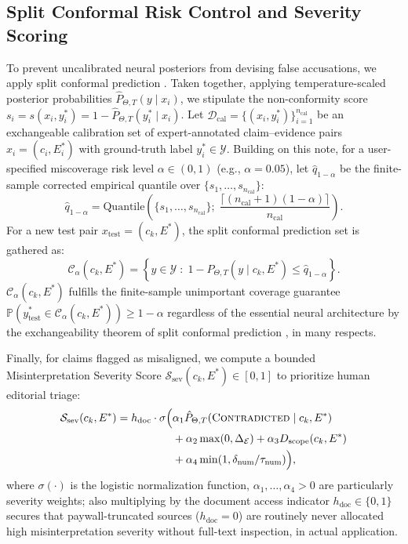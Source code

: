 \documentclass[sigconf]{acmart}
\begin{document}
\subsection{Split Conformal Risk Control and Severity Scoring}
To prevent uncalibrated neural posteriors from devising false accusations, we apply split conformal prediction \cite{sadinle2019least,angelopoulos2023conformal}. Taken together, applying temperature-scaled posterior probabilities $\hat{P}_{\Theta, T}(y \mid x_i)$, we stipulate the non-conformity score $s_i = s(x_i, y_i^*) = 1 - \hat{P}_{\Theta, T}(y_i^* \mid x_i)$. Let $\mathcal{D}_{\text{cal}} = \{(x_i, y_i^*)\}_{i=1}^{n_{\text{cal}}}$ be an exchangeable calibration set of expert-annotated claim--evidence pairs $x_i = (c_i, E_i^*)$ with ground-truth label $y_i^* \in \mathcal{Y}$. Building on this note, for a user-specified miscoverage risk level $\alpha \in (0, 1)$ (e.g., $\alpha = 0.05$), let $\hat{q}_{1-\alpha}$ be the finite-sample corrected empirical quantile over $\{s_1, \dots, s_{n_{\text{cal}}}\}$:
\begin{equation}
\hat{q}_{1-\alpha} = \text{Quantile}\!\left(\{s_1, \dots, s_{n_{\text{cal}}}\};\; \frac{\lceil (n_{\text{cal}} + 1)(1 - \alpha) \rceil}{n_{\text{cal}}}\right).
\label{eq:conformal_quantile}
\end{equation}
For a new test pair $x_{\text{test}} = (c_k, E^*)$, the split conformal prediction set is gathered as:
\begin{equation}
\mathcal{C}_{\alpha}(c_k, E^*) = \left\{ y \in \mathcal{Y} \;:\; 1 - \hat{P}_{\Theta, T}(y \mid c_k, E^*) \leq \hat{q}_{1-\alpha} \right\}.
\label{eq:conformal_set}
\end{equation}
$\mathcal{C}_{\alpha}(c_k, E^*)$ fulfills the finite-sample unimportant coverage guarantee $\mathbb{P}(y^*_{\text{test}} \in \mathcal{C}_{\alpha}(c_k, E^*)) \geq 1 - \alpha$ regardless of the essential neural architecture by the exchangeability theorem of split conformal prediction \cite{sadinle2019least,angelopoulos2023conformal}, in many respects.

Finally, for claims flagged as misaligned, we compute a bounded Misinterpretation Severity Score $\mathcal{S}_{\text{sev}}(c_k, E^*) \in [0, 1]$ to prioritize human editorial triage:
\begin{equation}
\begin{aligned}
\mathcal{S}_{\text{sev}}(c_k, E^*) = h_{\text{doc}} \cdot \sigma\Big( & \alpha_1 \hat{P}_{\Theta, T}(\textsc{Contradicted} \mid c_k, E^*) \\
& + \alpha_2 \max(0, \Delta_{\mathcal{E}}) + \alpha_3 D_{\text{scope}}(c_k, E^*) \\
& + \alpha_4 \min(1, \delta_{\text{num}} / \tau_{\text{num}}) \Big),
\end{aligned}
\label{eq:severity}
\end{equation}
where $\sigma(\cdot)$ is the logistic normalization function, $\alpha_1, \dots, \alpha_4 > 0$ are particularly severity weights; also multiplying by the document access indicator $h_{\text{doc}} \in \{0, 1\}$ secures that paywall-truncated sources ($h_{\text{doc}} = 0$) are routinely never allocated high misinterpretation severity without full-text inspection, in actual application.
\end{document}
